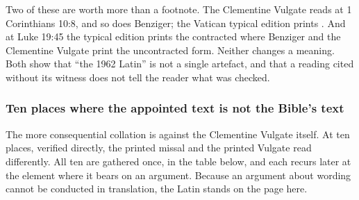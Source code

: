 Two of these are worth more than a footnote. The Clementine Vulgate reads
 at 1 Corinthians 10:8, and so does Benziger; the Vatican
typical edition prints . And at Luke 19:45 the typical edition
prints the contracted  where Benziger and the Clementine Vulgate
print the uncontracted form. Neither changes a meaning. Both show that ``the
1962 Latin'' is not a single artefact, and that a reading cited without its
witness does not tell the reader what was checked.

\subsubsection*{Ten places where the appointed text is not the Bible's text}

The more consequential collation is against the Clementine Vulgate itself.
At ten places, verified directly, the printed missal and the printed Vulgate
read differently. All ten are gathered once, in the table below, and
each recurs later at the element where it bears on an argument. Because an
argument about wording cannot be conducted in translation, the Latin stands on
the page here.

